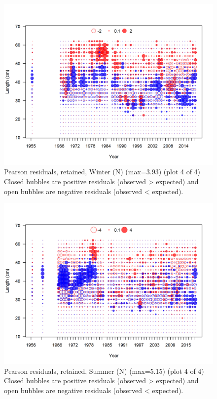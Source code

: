 \documentclass[12pt,]{article}
\begin{document}
\begin{figure}
\centering
\includegraphics{r4ss/plots_mod1/comp_lenfit_residsflt1mkt2_page4.png}
\caption{Pearson residuals, retained, Winter (N) (max=3.93) (plot 4 of
4)\\
Closed bubbles are positive residuals (observed \textgreater{} expected)
and open bubbles are negative residuals (observed \textless{} expected).
\label{fig:wn_len_pearson}}
\end{figure}

\begin{figure}
\centering
\includegraphics{r4ss/plots_mod1/comp_lenfit_residsflt2mkt2_page4.png}
\caption{Pearson residuals, retained, Summer (N) (max=5.15) (plot 4 of
4)\\
Closed bubbles are positive residuals (observed \textgreater{} expected)
and open bubbles are negative residuals (observed \textless{} expected).
\label{fig:sn_len_pearson}}
\end{figure}
\end{document}
